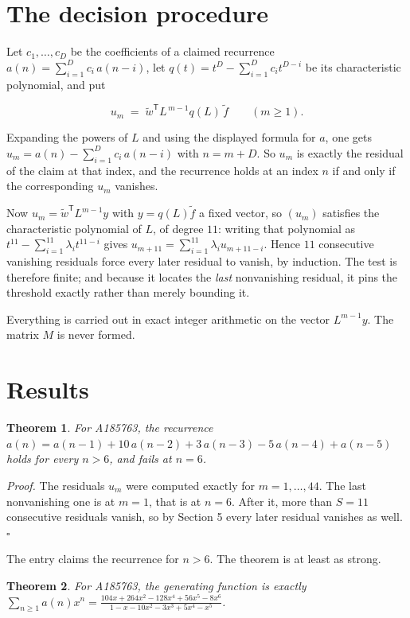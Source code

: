 \documentclass[11pt]{article}
\newtheorem{theorem}{Theorem}
\theoremstyle{definition}
\begin{document}
\section{The decision procedure}

Let $c_1,\dots,c_D$ be the coefficients of a claimed recurrence $a(n) = \sum_{i=1}^{D} c_i\,a(n-i)$, let $q(t) = t^{D} - \sum_{i=1}^{D} c_i t^{D-i}$ be its characteristic polynomial, and put

\[u_m \;=\; \tilde w^{\mathsf T} L^{\,m-1} q(L)\,\tilde f \qquad (m \ge 1).\]

Expanding the powers of $L$ and using the displayed formula for $a$, one gets $u_m = a(n) - \sum_{i=1}^{D} c_i\,a(n-i)$ with $n = m + D$. So $u_m$ is exactly the residual of the claim at that index, and the recurrence holds at an index $n$ if and only if the corresponding $u_m$ vanishes.

Now $u_m = \tilde w^{\mathsf T} L^{m-1} y$ with $y = q(L)\tilde f$ a fixed vector, so $(u_m)$ satisfies the characteristic polynomial of $L$, of degree $11$: writing that polynomial as $t^{11} - \sum_{i=1}^{11} \lambda_i t^{11-i}$ gives $u_{m+11} = \sum_{i=1}^{11} \lambda_i u_{m+11-i}$. Hence $11$ consecutive vanishing residuals force every later residual to vanish, by induction. The test is therefore finite; and because it locates the {\itshape last} nonvanishing residual, it pins the threshold exactly rather than merely bounding it.

Everything is carried out in exact integer arithmetic on the vector $L^{m-1}y$. The matrix $M$ is never formed.

\section{Results}

\begin{theorem} For A185763, the recurrence $a(n) = a(n-1) + 10\,a(n-2) + 3\,a(n-3) - 5\,a(n-4) + a(n-5)$ holds for every $n > 6$, and fails at $n = 6$.\end{theorem}

{\itshape Proof.} The residuals $u_m$ were computed exactly for $m = 1,\dots,44$. The last nonvanishing one is at $m = 1$, that is at $n = 6$. After it, more than $S = 11$ consecutive residuals vanish, so by Section 5 every later residual vanishes as well. $\square$

The entry claims the recurrence for $n > 6$. The theorem is at least as strong.

\begin{theorem} For A185763, the generating function is exactly $\sum_{n\ge 1} a(n)x^n = \frac{104x + 264x^{2} - 128x^{4} + 56x^{5} - 8x^{6}}{1 - x - 10x^{2} - 3x^{3} + 5x^{4} - x^{5}}$.\end{theorem}
\end{document}
